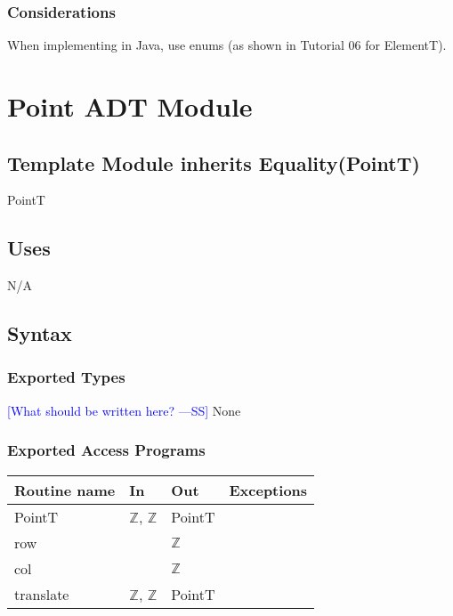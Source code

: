 \documentclass[12pt]{article}
\newcommand{\authornote}[3]{\textcolor{#1}{[#3 ---#2]}}
\newcommand{\authornote}[3]{}
\newcommand{\wss}[1]{\authornote{blue}{SS}{#1}}
\begin{document}
\subsubsection* {Considerations}

When implementing in Java, use enums (as shown in Tutorial 06 for ElementT).

\newpage

\section* {Point ADT Module}

\subsection*{Template Module inherits Equality(PointT)}

PointT

\subsection* {Uses}

N/A

\subsection* {Syntax}

\subsubsection* {Exported Types}

\wss{What should be written here?}
None

\subsubsection* {Exported Access Programs}

\begin{tabular}{| l | l | l | l |}
\hline
\textbf{Routine name} & \textbf{In} & \textbf{Out} & \textbf{Exceptions}\\
\hline
PointT & $\mathbb{Z}$, $\mathbb{Z}$ & PointT & \\
\hline
row & ~ & $\mathbb{Z}$ & ~\\
\hline
col & ~ & $\mathbb{Z}$ & ~\\
\hline
translate & $\mathbb{Z}$, $\mathbb{Z}$ & PointT & ~\\
\hline
\end{tabular}
\end{document}
